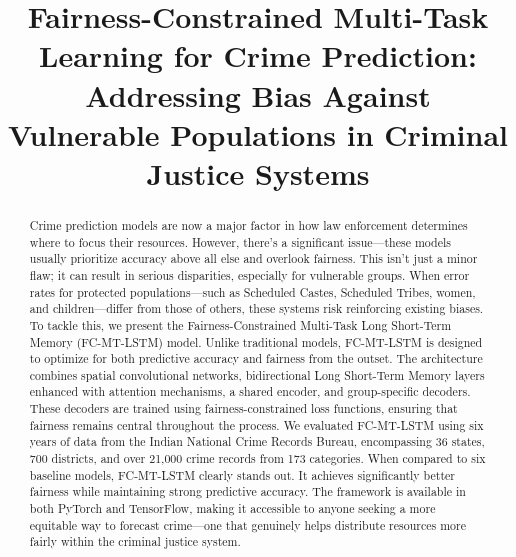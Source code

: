 \documentclass[conference]{IEEEtran}
\begin{document}
\title{Fairness-Constrained Multi-Task Learning for Crime Prediction: Addressing Bias Against Vulnerable Populations in Criminal Justice Systems}

\author{
}

\maketitle

\begin{abstract}
Crime prediction models are now a major factor in how law enforcement determines where to focus their resources. However, there's a significant issue---these models usually prioritize accuracy above all else and overlook fairness. This isn't just a minor flaw; it can result in serious disparities, especially for vulnerable groups. When error rates for protected populations---such as Scheduled Castes, Scheduled Tribes, women, and children---differ from those of others, these systems risk reinforcing existing biases. To tackle this, we present the Fairness-Constrained Multi-Task Long Short-Term Memory (FC-MT-LSTM) model. Unlike traditional models, FC-MT-LSTM is designed to optimize for both predictive accuracy and fairness from the outset. The architecture combines spatial convolutional networks, bidirectional Long Short-Term Memory layers enhanced with attention mechanisms, a shared encoder, and group-specific decoders. These decoders are trained using fairness-constrained loss functions, ensuring that fairness remains central throughout the process. We evaluated FC-MT-LSTM using six years of data from the Indian National Crime Records Bureau, encompassing 36 states, 700 districts, and over 21,000 crime records from 173 categories. When compared to six baseline models, FC-MT-LSTM clearly stands out. It achieves significantly better fairness while maintaining strong predictive accuracy. The framework is available in both PyTorch and TensorFlow, making it accessible to anyone seeking a more equitable way to forecast crime---one that genuinely helps distribute resources more fairly within the criminal justice system.
\end{abstract}
\end{document}
